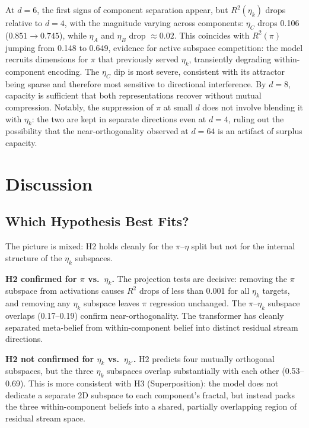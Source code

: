 \documentclass{article}
\begin{document}
At $d=6$, the first signs of component separation appear, but $R^2(\eta_k)$ drops
relative to $d=4$, with the magnitude varying across components: $\eta_C$ drops
0.106 ($0.851 \to 0.745$), while $\eta_A$ and $\eta_B$ drop $\approx 0.02$.
This coincides with $R^2(\pi)$ jumping from 0.148 to 0.649, evidence for
active subspace competition: the model recruits dimensions for $\pi$ that previously
served $\eta_k$, transiently degrading within-component encoding.
The $\eta_C$ dip is most severe, consistent with its attractor being sparse and
therefore most sensitive to directional interference.
By $d=8$, capacity is sufficient that both representations recover without mutual
compression.
Notably, the suppression of $\pi$ at small $d$ does not involve blending it
with $\eta_k$: the two are kept in separate directions even at $d=4$, ruling out
the possibility that the near-orthogonality observed at $d=64$ is an artifact of
surplus capacity.

\section{Discussion}
\label{sec:discussion}

\subsection{Which Hypothesis Best Fits?}

The picture is mixed: H2 holds cleanly for the $\pi$--$\eta$ split but not
for the internal structure of the $\eta_k$ subspaces.

\textbf{H2 confirmed for $\pi$ vs.\ $\eta_k$.}
The projection tests are decisive: removing the $\pi$ subspace from activations
causes $R^2$ drops of less than 0.001 for all $\eta_k$ targets, and removing
any $\eta_k$ subspace leaves $\pi$ regression unchanged.
The $\pi$--$\eta_k$ subspace overlaps (0.17--0.19) confirm near-orthogonality.
The transformer has cleanly separated meta-belief from within-component belief
into distinct residual stream directions.

\textbf{H2 not confirmed for $\eta_k$ vs.\ $\eta_{k'}$.}
H2 predicts four mutually orthogonal subspaces, but the three $\eta_k$
subspaces overlap substantially with each other (0.53--0.69).
This is more consistent with H3 (Superposition): the model does not dedicate a
separate 2D subspace to each component's fractal, but instead packs the three
within-component beliefs into a shared, partially overlapping region of
residual stream space.
\end{document}
